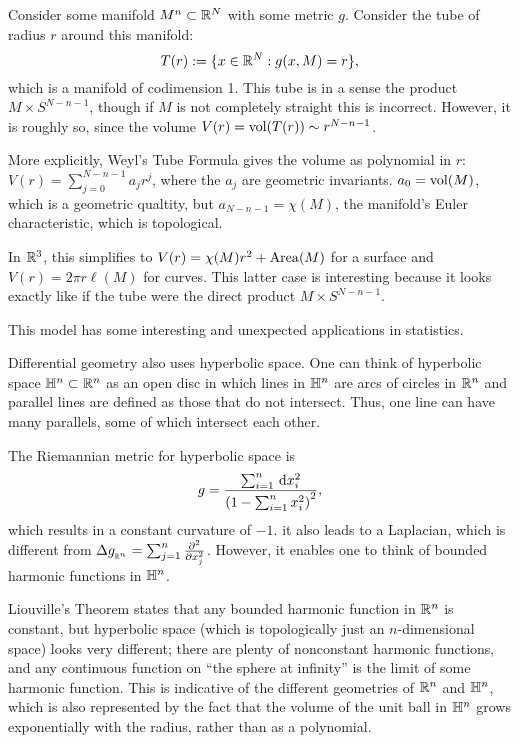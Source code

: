 Consider some manifold $M^n\subset \mathbb{R}^N$ with some metric $g$. Consider the tube of radius $r$ around this manifold:
\[T(r) :=\{x\in\mathbb{R}^N:g(x,M) = r\},\]
which is a manifold of codimension 1. This tube is in a sense the product $M \times S^{N-n-1}$, though if $M$ is not completely straight this is incorrect. However, it is roughly so, since the volume $V(r) = \operatorname{vol}(T(r)) \sim r^{N-n-1}$.

More explicitly, Weyl's Tube Formula gives the volume as polynomial in $r$: $V(r) = \sum_{j=0}^{N-n-1} a_jr^j$, where the $a_j$ are geometric invariants. $a_0 = \operatorname{vol}(M)$, which is a geometric qualtity, but $a_{N-n-1} = \chi(M)$, the manifold's Euler characteristic, which is topological.

In $\mathbb{R}^3$, this simplifies to $V(r) = \chi(M)r^2 + \operatorname{Area}(M)$ for a surface and $V(r) = 2\pi r\ell(M)$ for curves. This latter case is interesting because it looks exactly like if the tube were the direct product $M\times S^{N-n-1}$.

This model has some interesting and unexpected applications in statistics.

Differential geometry also uses hyperbolic space. One can think of hyperbolic space $\mathbb{H}^n\subset \mathbb{R}^n$ as an open disc in which lines in $\mathbb{H}^n$ are arcs of circles in $\mathbb{R}^n$ and parallel lines are defined as those that do not intersect. Thus, one line can have many parallels, some of which intersect each other.

The Riemannian metric for hyperbolic space is
\[g = \frac{\sum_{i=1}^n \,\mathrm{d} x_i^2}{\left(1- \sum_{i=1}^n x_i^2\right)^2},\]
which results in a constant curvature of $-1$. it also leads to a Laplacian, which is different from $\Delta g_{_{\mathbb{R}^n}} = \sum_{j=1}^n \frac{\partial^2}{\partial x_j^2}$. However, it enables one to think of bounded harmonic functions in $\mathbb{H}^n$.

Liouville's Theorem states that any bounded harmonic function in $\mathbb{R}^n$ is constant, but hyperbolic space (which is topologically just an $n$-dimensional space) looks very different; there are plenty of nonconstant harmonic functions, and any continuous function on ``the sphere at infinity'' is the limit of some harmonic function. This is indicative of the different geometries of $\mathbb{R}^n$ and $\mathbb{H}^n$, which is also represented by the fact that the volume of the unit ball in $\mathbb{H}^n$ grows exponentially with the radius, rather than as a polynomial.


